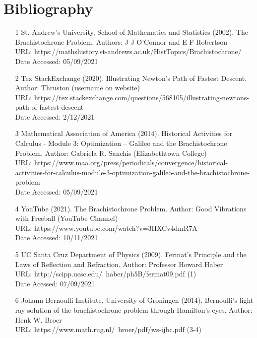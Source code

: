 \documentclass[12pt]{report}
\begin{document}
\chapter{Bibliography}
\begin{itemize}
    \item [1]  St. Andrew's University, School of Mathematics and Statistics (2002). The Brachistochrone Problem.
    Authors: J J O'Connor and E F Robertson
    \\
    URL: https://mathshistory.st-andrews.ac.uk/HistTopics/Brachistochrone/
    \\
    Date Accessed: 05/09/2021
    \item [2] Tex StackExchange (2020). Illustrating Newton's Path of Fastest Descent. 
    Author: Thruston (username on website)
    \\
    URL: https://tex.stackexchange.com/questions/568105/illustrating-newtons-path-of-fastest-descent
    \\
    Date Accessed: 2/12/2021
    \item [3] Mathematical Association of America (2014). Historical Activities for Calculus - Module 3: Optimization – Galileo and the Brachistochrone Problem.
    Author: Gabriela R. Sanchis (Elizabethtown College)
    \\
    URL: https://www.maa.org/press/periodicals/convergence/historical-activities-for-calculus-module-3-optimization-galileo-and-the-brachistochrone-problem
    \\
    Date Accessed: 05/09/2021
    \item [4] YouTube (2021). The Brachistochrone Problem. Author: Good Vibrations with Freeball (YouTube Channel)
    \\
    URL: https://www.youtube.com/watch?v=3HXCv4dmR7A
    \\
    Date Accessed: 10/11/2021
    \item [5] UC Santa Cruz Department of Physics (2009). Fermat’s Principle and the Laws of Reflection and Refraction. Author: Professor Howard Haber
    \\
    URL: http://scipp.ucsc.edu/~haber/ph5B/fermat09.pdf (1)
    \\
    Date Acessed: 07/09/2021
    \item [6] Johann Bernoulli Institute, University of Groningen (2014). Bernoulli’s light ray solution of the brachistochrone problem through Hamilton’s eyes. Author: Henk W. Broer
    \\
    URL: https://www.math.rug.nl/~broer/pdf/ws-ijbc.pdf (3-4)

\end{itemize}
\end{document}
